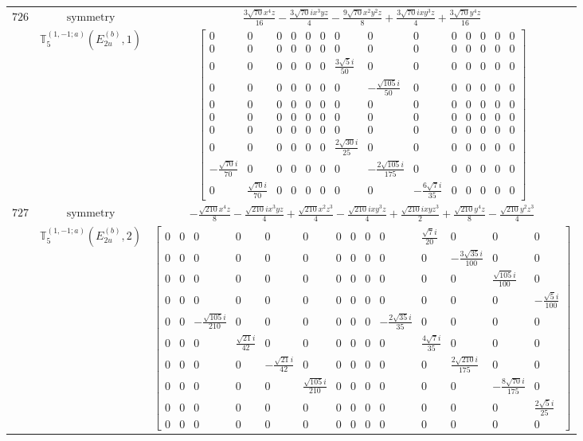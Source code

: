 \documentclass[fleqn,8pt,landscape]{jsarticle}
\begin{document}
\begin{longtable}{ccc}
$ 726 $ & $ \text{symmetry} $ & $ \frac{3 \sqrt{70} x^{4} z}{16} - \frac{3 \sqrt{70} i x^{3} y z}{4} - \frac{9 \sqrt{70} x^{2} y^{2} z}{8} + \frac{3 \sqrt{70} i x y^{3} z}{4} + \frac{3 \sqrt{70} y^{4} z}{16} $ \\
$  $ & $ \mathbb{T}_{5}^{(1,-1;a)}(E_{2u}^{(b)},1) $ & $ \begin{bmatrix} 0 & 0 & 0 & 0 & 0 & 0 & 0 & 0 & 0 & 0 & 0 & 0 & 0 & 0 \\ 0 & 0 & 0 & 0 & 0 & 0 & 0 & 0 & 0 & 0 & 0 & 0 & 0 & 0 \\ 0 & 0 & 0 & 0 & 0 & 0 & \frac{3 \sqrt{5} i}{50} & 0 & 0 & 0 & 0 & 0 & 0 & 0 \\ 0 & 0 & 0 & 0 & 0 & 0 & 0 & - \frac{\sqrt{105} i}{50} & 0 & 0 & 0 & 0 & 0 & 0 \\ 0 & 0 & 0 & 0 & 0 & 0 & 0 & 0 & 0 & 0 & 0 & 0 & 0 & 0 \\ 0 & 0 & 0 & 0 & 0 & 0 & 0 & 0 & 0 & 0 & 0 & 0 & 0 & 0 \\ 0 & 0 & 0 & 0 & 0 & 0 & 0 & 0 & 0 & 0 & 0 & 0 & 0 & 0 \\ 0 & 0 & 0 & 0 & 0 & 0 & \frac{2 \sqrt{30} i}{25} & 0 & 0 & 0 & 0 & 0 & 0 & 0 \\ - \frac{\sqrt{70} i}{70} & 0 & 0 & 0 & 0 & 0 & 0 & - \frac{2 \sqrt{105} i}{175} & 0 & 0 & 0 & 0 & 0 & 0 \\ 0 & \frac{\sqrt{70} i}{70} & 0 & 0 & 0 & 0 & 0 & 0 & - \frac{6 \sqrt{7} i}{35} & 0 & 0 & 0 & 0 & 0 \end{bmatrix} $ \\ \hline
$ 727 $ & $ \text{symmetry} $ & $ - \frac{\sqrt{210} x^{4} z}{8} - \frac{\sqrt{210} i x^{3} y z}{4} + \frac{\sqrt{210} x^{2} z^{3}}{4} - \frac{\sqrt{210} i x y^{3} z}{4} + \frac{\sqrt{210} i x y z^{3}}{2} + \frac{\sqrt{210} y^{4} z}{8} - \frac{\sqrt{210} y^{2} z^{3}}{4} $ \\
$  $ & $ \mathbb{T}_{5}^{(1,-1;a)}(E_{2u}^{(b)},2) $ & $ \begin{bmatrix} 0 & 0 & 0 & 0 & 0 & 0 & 0 & 0 & 0 & 0 & \frac{\sqrt{7} i}{20} & 0 & 0 & 0 \\ 0 & 0 & 0 & 0 & 0 & 0 & 0 & 0 & 0 & 0 & 0 & - \frac{3 \sqrt{35} i}{100} & 0 & 0 \\ 0 & 0 & 0 & 0 & 0 & 0 & 0 & 0 & 0 & 0 & 0 & 0 & \frac{\sqrt{105} i}{100} & 0 \\ 0 & 0 & 0 & 0 & 0 & 0 & 0 & 0 & 0 & 0 & 0 & 0 & 0 & - \frac{\sqrt{5} i}{100} \\ 0 & 0 & - \frac{\sqrt{105} i}{210} & 0 & 0 & 0 & 0 & 0 & 0 & - \frac{2 \sqrt{35} i}{35} & 0 & 0 & 0 & 0 \\ 0 & 0 & 0 & \frac{\sqrt{21} i}{42} & 0 & 0 & 0 & 0 & 0 & 0 & \frac{4 \sqrt{7} i}{35} & 0 & 0 & 0 \\ 0 & 0 & 0 & 0 & - \frac{\sqrt{21} i}{42} & 0 & 0 & 0 & 0 & 0 & 0 & \frac{2 \sqrt{210} i}{175} & 0 & 0 \\ 0 & 0 & 0 & 0 & 0 & \frac{\sqrt{105} i}{210} & 0 & 0 & 0 & 0 & 0 & 0 & - \frac{8 \sqrt{70} i}{175} & 0 \\ 0 & 0 & 0 & 0 & 0 & 0 & 0 & 0 & 0 & 0 & 0 & 0 & 0 & \frac{2 \sqrt{5} i}{25} \\ 0 & 0 & 0 & 0 & 0 & 0 & 0 & 0 & 0 & 0 & 0 & 0 & 0 & 0 \end{bmatrix} $ \\ \hline

\end{longtable}
\end{document}
